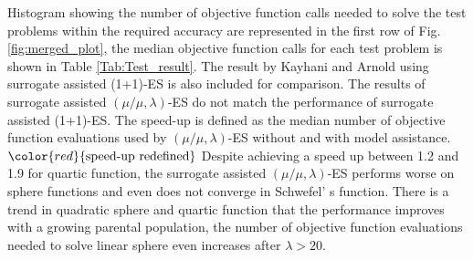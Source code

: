 Histogram showing the number of objective function calls needed to solve the test problems within the required accuracy are represented in the first row of Fig. \ref{fig:merged_plot}, the median objective function calls for each test problem is shown in Table \ref{Tab:Test_result}. The result by Kayhani and Arnold \cite{DBLP:conf/ppsn/KayhaniA18} using surrogate assisted (1+1)-ES is also included for comparison. The results of surrogate assisted $(\mu/\mu,\lambda)$-ES do not match the performance of surrogate assisted (1+1)-ES. The speed-up is defined as the median number of objective function evaluations used by $(\mu/\mu,\lambda)$-ES without and with model assistance. 
$\color{red}{\text{speed-up redefined}}$
Despite achieving a speed up between 1.2 and 1.9 for quartic function, the surrogate assisted $(\mu/\mu,\lambda)$-ES performs worse on sphere functions and even does not converge in Schwefel' s function. There is a trend in quadratic sphere and quartic function that the performance improves with a growing parental population, the number of objective function evaluations needed to solve linear sphere even increases after $\lambda>20$. 

